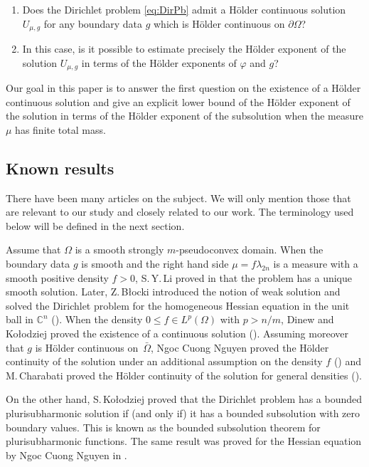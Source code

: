 \documentclass[JEP,XML,SOM,Unicode]{cedram}
\theoremstyle{definition}
\renewcommand{\C}{\mathbb{C}}
\begin{document}
\begin{enumerate}
\item
Does the Dirichlet problem \eqref{eq:DirPb} admit a Hölder continuous solution $U_{\mu,g}$ for any boundary data $g$ which is Hölder continuous on $\partial{\Omega}$?

\item
In this case, is it possible to estimate precisely the Hölder exponent of the solution $U_{\mu,g}$ in terms of the Hölder exponents of $\varphi$ and $g$?
\end{enumerate}

Our goal in this paper is to answer the first question on the existence of a Hölder continuous solution and give an explicit lower bound of the Hölder exponent of the solution in terms of the Hölder exponent of the subsolution when the measure $\mu$ has finite total mass.

\subsection{Known results}
There have been many articles on the subject. We will only mention those that are relevant to our study and closely related to our work.
The terminology used below will be defined in the next section.

Assume that $\Omega$ is a smooth strongly $m$-pseudoconvex domain. When the boundary data $g$ is smooth and the right hand side $\mu = f \lambda_{2n}$ is a measure with a smooth positive density $f > 0$, S.\,Y.\,Li proved in \cite{Li04} that the problem has a unique smooth solution. Later, Z.\,B\l ocki introduced the notion of weak solution and solved the Dirichlet problem for the homogeneous Hessian equation in the unit ball in $\C^n$ (\cite{Bl05}).
When the density $0 \leq f \in L^p (\Omega)$ with $p > n \slash m$, Dinew and Ko\l odziej proved the existence of a continuous solution (\cite{DK14}). Assuming moreover that $g$ is Hölder continuous on~$\bar \Omega$, Ngoc Cuong Nguyen proved the Hölder continuity of the solution under an additional assumption on the density $f$ (\cite{N14}) and M.\,Charabati proved the Hölder continuity of the solution for general densities (\cite{Ch16}).

On the other hand, S.\,Ko\l odziej \cite{Kol05} proved that the Dirichlet problem has a bounded plurisubharmonic solution if (and only if) it has a bounded subsolution with zero boundary values. This is known as the bounded subsolution theorem for plurisubharmonic functions. The same result was proved for the Hessian equation by Ngoc Cuong Nguyen in \cite{N13}.
\end{document}
